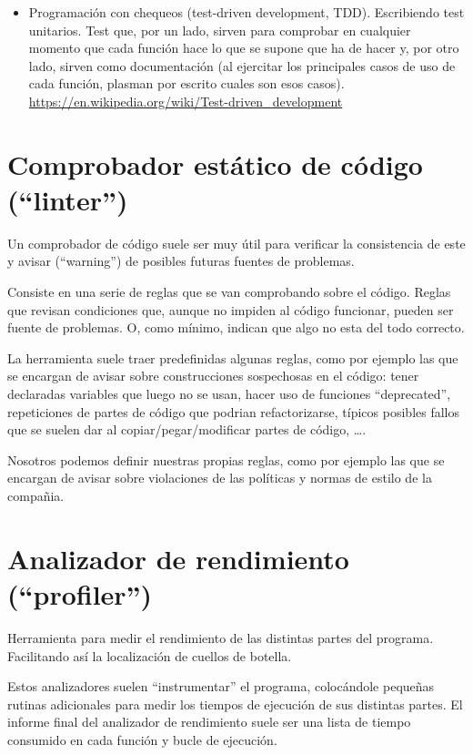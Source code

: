 \documentclass[spanish,12pt,a4paper,final,oneside]{book}
\begin{document}
\begin{itemize}
\item Programación con chequeos (test-driven development, TDD). Escribiendo test unitarios. Test que, por un lado, sirven para comprobar en cualquier momento que cada función hace lo que se supone que ha de hacer y, por otro lado, sirven como documentación (al ejercitar los principales casos de uso de cada función, plasman por escrito cuales son esos casos).
\\ \url{https://en.wikipedia.org/wiki/Test-driven_development}

\end{itemize} 


\section{Comprobador estático de código (``linter'')}

Un comprobador de código  suele ser muy útil para verificar la consistencia de este y avisar (``warning'') de posibles futuras fuentes de problemas.

Consiste en una serie de reglas que se van comprobando sobre el código. Reglas que revisan condiciones que, aunque no impiden al código funcionar, pueden ser fuente de problemas. O, como mínimo, indican que algo no esta del todo correcto.

La herramienta suele traer predefinidas algunas reglas, como por ejemplo las que se encargan de avisar sobre construcciones sospechosas en el código: tener declaradas variables que luego no se usan, hacer uso de funciones ``deprecated'', repeticiones de partes de código que podrian refactorizarse, típicos posibles fallos que se suelen dar al copiar/pegar/modificar partes de código, \ldots.

Nosotros podemos definir nuestras propias reglas, como por ejemplo las que se encargan de avisar sobre violaciones de las políticas y normas de estilo de la compañia.


\section{Analizador de rendimiento (``profiler'')}
Herramienta para medir el rendimiento de las distintas partes del programa. Facilitando así la localización de cuellos de botella.

Estos analizadores suelen ``instrumentar'' el programa, colocándole pequeñas rutinas adicionales para medir los tiempos de ejecución de sus distintas partes. El informe final del analizador de rendimiento suele ser una lista de tiempo consumido en cada función y bucle de ejecución.
\end{document}
